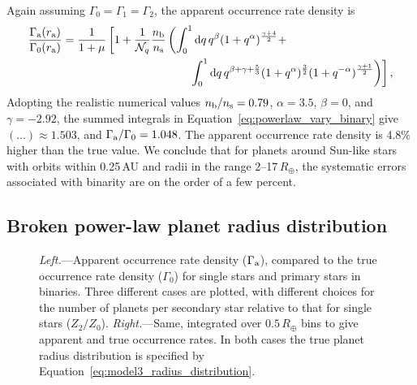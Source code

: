 \documentclass[12pt,modern]{aastex61}
\renewcommand{\a}{_{\rm a}}
\newcommand{\s}{_{\rm s}}
\renewcommand{\b}{_{\rm b}}
\begin{document}
Again assuming $\Gamma_0=\Gamma_1=\Gamma_2$, the apparent occurrence
rate density is 
\begin{align}
    \notag
    \frac{\Gamma\a(r\a)}{\Gamma_0(r\a)} 
    &=
    \frac{1}{1+\mu}
    \left[
      1 + \frac{1}{\mathcal{N}_q} \frac{n\b}{n\s}
    \left(
      \int_0^1 {\rm d}q\,q^\beta (1+q^\alpha)^{\frac{\gamma+4}{2}} +
      \right.
      \right. \\
      &\quad\quad\quad\quad\quad\quad\quad\quad\quad\quad\quad
      \left.\left.
      \int_0^1 {\rm d}q\,q^{\beta+\gamma+\frac{5}{3}} 
      (1+q^\alpha)^{\frac{3}{2}}
      (1+q^{-\alpha})^{\frac{\gamma+1}{2}}
    \right)
    \right],
    \label{eq:powerlaw_vary_binary}
\end{align}
Adopting the realistic numerical values $n\b/n\s=0.79$, $\alpha =
3.5$, $\beta=0$, and $\gamma=-2.92$, the summed integrals in
Equation~\ref{eq:powerlaw_vary_binary} give $(\ldots)\approx 1.503$,
and $\Gamma\a/\Gamma_0 = 1.048$.  The apparent occurrence rate density
is 4.8\% higher than the true value.  We conclude that for planets around
Sun-like stars with orbits within 0.25\,AU and radii in the range
2--17\,$R_\oplus$, the systematic errors associated with binarity are
on the order of a few percent.


\subsection{Broken power-law planet radius distribution}
\label{sec:model_3}

\begin{figure}[!t]
    \centering
    \caption{ {\it Left.}---Apparent occurrence rate density
      ($\Gamma\a$), compared to the true occurrence rate density
      ($\Gamma_0$) for single stars and primary stars in binaries.
      Three different cases are plotted, with different choices for
      the number of planets per secondary star relative to
      that for single stars ($Z_2/Z_0$).
      {\it Right.}---Same, integrated over $0.5\,R_\oplus$
      bins to give apparent and true occurrence rates.
      In both cases the true planet
      radius distribution is specified by
      Equation~\ref{eq:model3_radius_distribution}.
    }
    \label{fig:occ_rate_model_3_log}
\end{figure}
\end{document}
